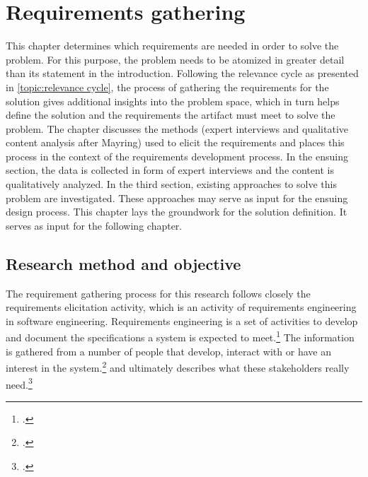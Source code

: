 \chapter{Requirements gathering} \label{chap:ReqEng}

This chapter determines which requirements are needed in order to solve the problem. For this purpose, the problem needs to be atomized in greater detail than its statement in the introduction. Following the relevance cycle as presented in \ref{topic:relevance cycle}, the process of gathering the requirements for the solution gives additional insights into the problem space, which in turn helps define the solution and the requirements the artifact must meet to solve the problem. The chapter discusses the methods (expert interviews and qualitative content analysis after Mayring) used to elicit the requirements and places this process in the context of the requirements development process. In the ensuing section, the data is collected in form of expert interviews and the content is qualitatively analyzed. In the third section, existing approaches to solve this problem are investigated. These approaches may serve as input for the ensuing design process. This chapter lays the groundwork for the solution definition. It serves as input for the following chapter. 

\section{Research method and objective}
The requirement gathering process for this research follows closely the requirements elicitation activity, which is an activity of requirements engineering in software engineering. Requirements engineering is a set of activities to develop and document the specifications a system is expected to meet.\footcite[Cf.][p.16]{SommervilleIntegratedrequirementsengineering2005} The information is gathered from a number of people that develop, interact with or have an interest in the system.\footcite[Cf.][p.38]{PatakiSystemRequirementsAnalysis2003} and ultimately describes what these stakeholders really need.\footcite[Cf.][p.1]{GoguenTechniquesrequirementelicitation1993}

